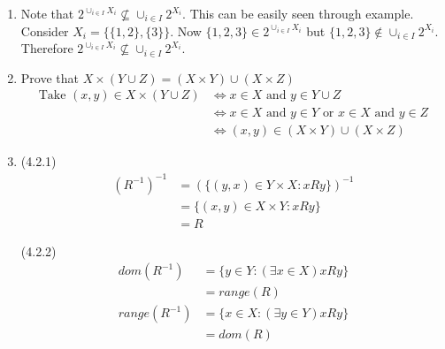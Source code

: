 \begin{enumerate}
    (2.13.5) Consider:\\
    \begin{align*}
        (X \cup Y) \setminus (X \wedge Y) &= ((X \cup Y) \setminus X) \cup ((X \cup Y) \ Y)\\
        &= (Y \setminus X) \cup (X \setminus Y)\\
        &= X \vartriangle Z\\
        \therefore X \vartriangle Y = (X \cup Y) \setminus (X \cap Y)
    \end{align*}

    \item Note that $2^{\cup_{i \in I} X_{i}} \nsubseteq \cup_{i \in I} 2^{X_{i}}$. This can be easily seen through example. Consider $X_{i} = \{\{1,2\},\{3\}\}$. Now $\{1,2,3\} \in 2^{\cup_{i \in I} X_{i}}$ but $\{1,2,3\} \notin \cup_{i \in I} 2^{X_{i}}$. Therefore $2^{\cup_{i \in I} X_{i}} \nsubseteq \cup_{i \in I} 2^{X_{i}}$.

    \item Prove that $X\times(Y \cup Z) = (X \times Y) \cup (X \times Z)$\\
        \begin{align*}
            \text{Take } (x,y) \in X \times (Y \cup Z) &\Leftrightarrow x \in X \text{ and } y \in Y \cup Z\\
            &\Leftrightarrow x \in X \text{ and } y \in Y \text{ or } x \in X \text{ and } y \in Z\\
            &\Leftrightarrow (x,y) \in  (X \times Y) \cup (X \times Z)
        \end{align*}

    \item 
    (4.2.1)
    \begin{align*}
        (R^{-1})^{-1} &= (\{(y,x) \in Y \times X : xRy\})^{-1}\\
        &=\{(x,y) \in X \times Y : xRy\}\\
        &=R
    \end{align*}

    (4.2.2)\\
    \begin{align*}
        dom(R^{-1}) &= \{y \in Y : (\exists x \in X) xRy\}\\
        &= range(R)\\
        range(R^{-1}) &= \{x \in X : (\exists y \in Y) xRy\}\\
        &= dom(R)    
    \end{align*}

\end{enumerate}
